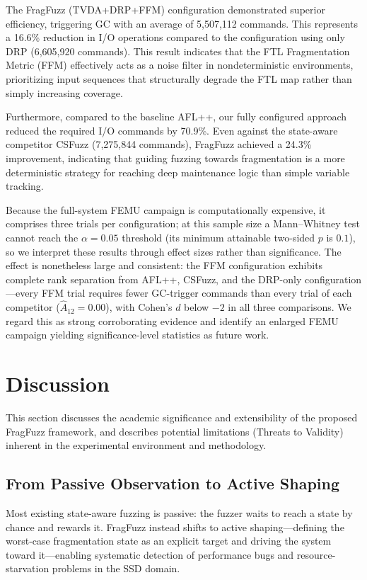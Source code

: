 \documentclass[conference]{IEEEtran}
\begin{document}
The FragFuzz (TVDA+DRP+FFM) configuration demonstrated superior efficiency, triggering GC with an average of 5,507,112 commands.
This represents a 16.6\% reduction in I/O operations compared to the configuration using only DRP (6,605,920 commands).
This result indicates that the FTL Fragmentation Metric (FFM) effectively acts as a noise filter in nondeterministic environments, prioritizing input sequences that structurally degrade the FTL map rather than simply increasing coverage.

Furthermore, compared to the baseline AFL++, our fully configured approach reduced the required I/O commands by 70.9\%.
Even against the state-aware competitor CSFuzz (7,275,844 commands), FragFuzz achieved a 24.3\% improvement, indicating that guiding fuzzing towards fragmentation is a more deterministic strategy for reaching deep maintenance logic than simple variable tracking.

Because the full-system FEMU campaign is computationally expensive, it comprises three trials per configuration; at this sample size a Mann--Whitney test cannot reach the $\alpha=0.05$ threshold (its minimum attainable two-sided $p$ is $0.1$), so we interpret these results through effect sizes rather than significance.
The effect is nonetheless large and consistent: the FFM configuration exhibits complete rank separation from AFL++, CSFuzz, and the DRP-only configuration---every FFM trial requires fewer GC-trigger commands than every trial of each competitor ($\hat{A}_{12}=0.00$), with Cohen's $d$ below $-2$ in all three comparisons.
We regard this as strong corroborating evidence and identify an enlarged FEMU campaign yielding significance-level statistics as future work.

\section{Discussion}
This section discusses the academic significance and extensibility of the proposed FragFuzz framework, and describes potential limitations (Threats to Validity) inherent in the experimental environment and methodology.

\subsection{From Passive Observation to Active Shaping}
Most existing state-aware fuzzing is passive: the fuzzer waits to reach a state by chance and rewards it.
FragFuzz instead shifts to active shaping---defining the worst-case fragmentation state as an explicit target and driving the system toward it---enabling systematic detection of performance bugs and resource-starvation problems in the SSD domain.
\end{document}
